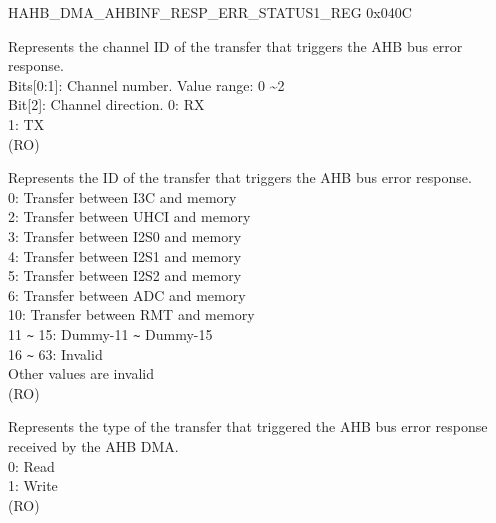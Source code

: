 {    \begin{register}{H}{AHB\_DMA\_AHBINF\_RESP\_ERR\_STATUS1\_REG} {0x040C}\label{regdesc:AHBDMAAHBINFRESPERRSTATUS1REG}
    \regnewline%
    \begin{regdesc}\begin{reglist}
    \label{fielddesc:AHBDMAAHBINFRESPERRCHID}\item [AHB\_DMA\_AHBINF\_RESP\_ERR\_CH\_ID] Represents the channel ID of the transfer that triggers the AHB bus error response.\\
    Bits[0:1]: Channel number. Value range: 0 \textasciitilde 2\\
    Bit[2]: Channel direction.
    0: RX\\
    1: TX\\ (RO)
    \label{fielddesc:AHBDMAAHBINFRESPERRID}\item [AHB\_DMA\_AHBINF\_RESP\_ERR\_ID] Represents the ID of the transfer that triggers the AHB bus error response.\\
    0: Transfer between I3C and memory\\
    2: Transfer between UHCI and memory\\
    3: Transfer between I2S0 and memory\\
    4: Transfer between I2S1 and memory\\
    5: Transfer between I2S2 and memory\\
    6: Transfer between ADC and memory\\
    10: Transfer between RMT and memory\\
    11 \verb+~+ 15: Dummy-11 \verb+~+ Dummy-15\\
    16 \verb+~+ 63: Invalid\\
    Other values are invalid\\
    (RO)
    \label{fielddesc:AHBDMAAHBINFRESPERRWR}\item [AHB\_DMA\_AHBINF\_RESP\_ERR\_WR] Represents the type of the transfer that triggered the AHB bus error response received by the AHB DMA.\\
    0: Read\\
    1: Write\\ (RO)
    \end{reglist}\end{regdesc}
    \end{register}


}
